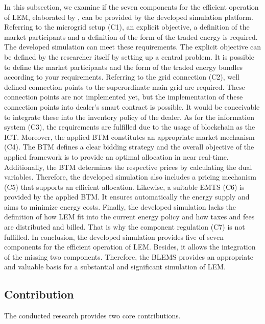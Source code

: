 In this subsection, we examine if the seven components for the efficient operation of LEM,
elaborated by , can be 
provided by the developed simulation platform.
Referring to the microgrid setup (C1), an explicit objective, a definition of the market participants and a definition of the form of the traded energy is required. The developed simulation can meet these requirements. The explicit objective can be defined by the researcher itself by setting up a central problem. It is possible to define the market participants and the form of the traded energy bundles
according to your requirements.
Referring to the grid connection (C2), well defined connection points to the superordinate main grid are required.
These connection points are not implemented yet, but the implementation of these connection points 
into dealer's smart contract is possible.
It would be conceivable to integrate these into the inventory policy of the dealer.
As for the information system (C3), the requirements are fulfilled due to the usage of blockchain as the ICT.
Moreover, the applied BTM constitutes an appropriate market mechanism (C4). The BTM defines a clear bidding strategy and the 
overall objective of the applied framework is to provide an optimal allocation in near real-time. 
Additionally, the BTM determines the respective prices by calculating the dual variables.
Therefore, the developed simulation also includes a pricing mechanism (C5) that supports an efficient allocation.
Likewise, a suitable EMTS (C6) is provided by the applied BTM. 
It ensures automatically the energy supply and aims to minimize energy costs.
Finally, the developed simulation lacks the definition of how LEM fit into the current energy policy and how taxes and fees are distributed and billed. 
That is why the component regulation (C7) is not fulfilled. 
In conclusion, the developed simulation provides five of seven components for the efficient operation of LEM. 
Besides, it allows the integration of the missing two components.
Therefore, the BLEMS provides an appropriate and valuable basis for a substantial and significant simulation of LEM. 

\subsection{Contribution}
The conducted research provides two core contributions.

